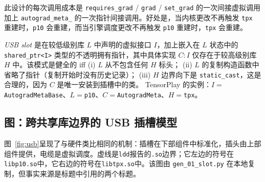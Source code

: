 此设计的每次调用成本是 \texttt{requires\_grad} / \texttt{grad} / \texttt{set\_grad} 的一次间接虚拟调用加上 \texttt{autograd\_meta\_} 的一次指针间接调用。好处是，当内核更改不再触发 \texttt{tpx} 重建时，\texttt{p10} 会重建，而当引擎调度更改不再触发 \texttt{p10} 重建时，\texttt{tpx} 会重建。

\begin{tpdef}
\emph{USB slot} 是在较低级别库 $L$ 中声明的虚拟接口 $I$，加上嵌入在 $L$ 状态中的 \texttt{shared\_ptr<I>} 类型的不透明拥有指针，其中具体实现 $C{:}I$ 仅存在于较高级别库 $H$ 中。该模式是健全的 iff (i) $L$ 从不包含任何 $H$ 标头； (ii) $L$ 的复制构造函数中省略了指针（复制开始时没有历史记录）； (iii) $H$ 边界向下是 \texttt{static\_cast}，这是合理的，因为 $C$ 是唯一安装到插槽中的类。 TensorPlay 的实例：$I{=}$\texttt{AutogradMetaBase}、$L{=}$\texttt{p10}、$C{=}$\texttt{AutogradMeta}、$H{=}$\texttt{tpx}。
\end{tpdef}

\subsection{图：跨共享库边界的 USB 插槽模型}
\label{sec:arch:figure}

图~\ref{fig:usb}呈现了与硬件类比相同的机制：插槽在下部组件中标准化，插头由上部组件提供，电缆是虚拟调度。虚线是\texttt{ldd}报告的\texttt{.so}边界；它左边的符号在\texttt{libp10.so}中，它右边的符号在\texttt{libtpx.so}中。该图由 \texttt{gen\_01\_slot.py} 在本地复制，但事实来源是标题中引用的两个标题。

